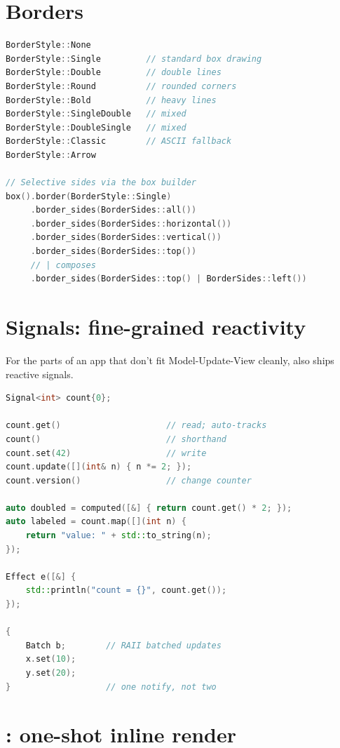 \section{Borders}

\begin{lstlisting}[language=C++]
BorderStyle::None
BorderStyle::Single         // standard box drawing
BorderStyle::Double         // double lines
BorderStyle::Round          // rounded corners
BorderStyle::Bold           // heavy lines
BorderStyle::SingleDouble   // mixed
BorderStyle::DoubleSingle   // mixed
BorderStyle::Classic        // ASCII fallback
BorderStyle::Arrow

// Selective sides via the box builder
box().border(BorderStyle::Single)
     .border_sides(BorderSides::all())
     .border_sides(BorderSides::horizontal())
     .border_sides(BorderSides::vertical())
     .border_sides(BorderSides::top())
     // | composes
     .border_sides(BorderSides::top() | BorderSides::left())
\end{lstlisting}

\section{Signals: fine-grained reactivity}

For the parts of an app that don't fit Model-Update-View
cleanly, \maya{} also ships reactive signals.

\begin{lstlisting}[language=C++]
Signal<int> count{0};

count.get()                     // read; auto-tracks
count()                         // shorthand
count.set(42)                   // write
count.update([](int& n) { n *= 2; });
count.version()                 // change counter

auto doubled = computed([&] { return count.get() * 2; });
auto labeled = count.map([](int n) {
    return "value: " + std::to_string(n);
});

Effect e([&] {
    std::println("count = {}", count.get());
});

{
    Batch b;        // RAII batched updates
    x.set(10);
    y.set(20);
}                   // one notify, not two
\end{lstlisting}

\section{: one-shot inline render}

